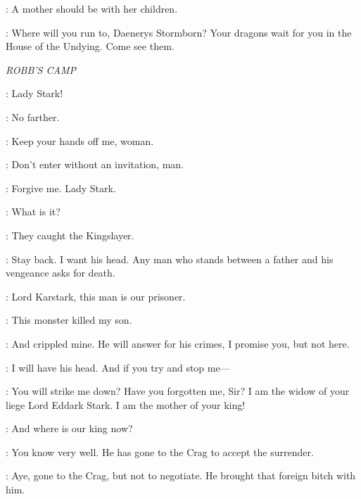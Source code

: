 \PYAT: A mother should be with her children.


\PYAT: Where will you run to, Daenerys Stormborn? Your dragons wait for you in the House of the Undying. Come see them.



\scene

\textit{ROBB'S CAMP}


\JACKS: Lady Stark!

\BRIENNE: No farther.

\JACKS: Keep your hands off me, woman.

\BRIENNE: Don't enter without an invitation, man.

\JACKS: Forgive me. Lady Stark.

\BRIENNE: What is it?

\JACKS: They caught the Kingslayer.



\KARSTARK: Stay back. I want his head. Any man who stands between a father and his vengeance asks for death.


\CATELYN: Lord Karstark, this man is our prisoner.

\KARSTARK: This monster killed my son.

\CATELYN: And crippled mine. He will answer for his crimes, I promise you, but not here.

\KARSTARK: I will have his head. And if you try and stop me---

\CATELYN: You will strike me down? Have you forgotten me, Sir? I am the widow of your liege Lord Eddark Stark. I am the mother of your king!

\KARSTARK: And where is our king now?

\CATELYN: You know very well. He has gone to the Crag to accept the surrender.

\KARSTARK: Aye, gone to the Crag, but not to negotiate. He brought that foreign bitch with him.

